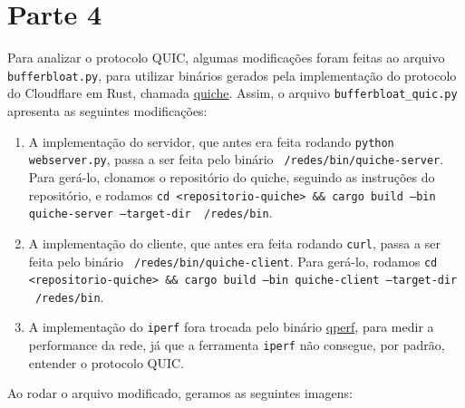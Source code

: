 \documentclass[a4paper,12pt]{article}
\newcommand{\code}[1]{\texttt{#1}}
\begin{document}
\section{Parte 4}

Para analizar o protocolo QUIC, algumas modificações foram feitas ao arquivo \code{bufferbloat.py}, para utilizar binários gerados pela implementação do protocolo do Cloudflare em Rust, chamada \href{https://github.com/cloudflare/quiche}{quiche}. Assim, o arquivo \code{bufferbloat\_quic.py} apresenta as seguintes modificações:
\begin{enumerate}
\item A implementação do servidor, que antes era feita rodando \code{python webserver.py}, passa a ser feita pelo binário \code{~/redes/bin/quiche-server}. Para gerá-lo, clonamos o repositório do quiche, seguindo as instruções do repositório, e rodamos \code{cd <repositorio-quiche> \&\& cargo build --bin quiche-server --target-dir ~/redes/bin}.
\item A implementação do cliente, que antes era feita rodando \code{curl}, passa a ser feita pelo binário \code{~/redes/bin/quiche-client}. Para gerá-lo, rodamos \code{cd <repositorio-quiche> \&\& cargo build --bin quiche-client --target-dir ~/redes/bin}.
\item A implementação do \code{iperf} fora trocada pelo binário \href{https://github.com/rbruenig/qperf}{qperf}, para medir a performance da rede, já que a ferramenta \code{iperf} não consegue, por padrão, entender o protocolo QUIC.
\end{enumerate}

Ao rodar o arquivo modificado, geramos as seguintes imagens:
\end{document}
